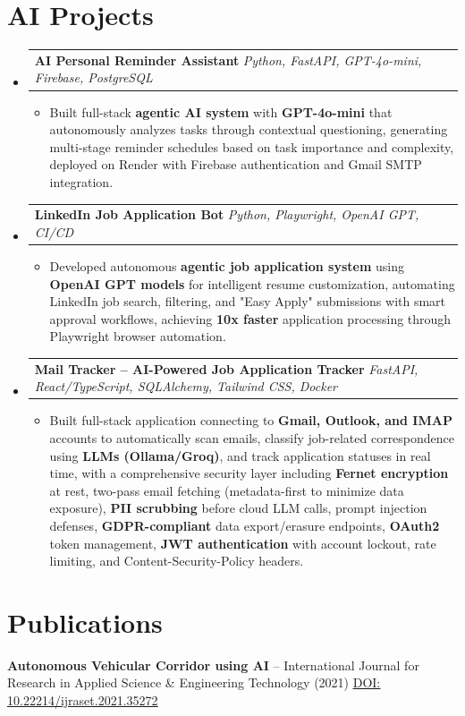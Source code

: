 \documentclass[letterpaper,11pt]{article}
\makeatletter
\newcommand{\resumeItem}[1]{
  \item\small{
    {#1 \vspace{-2pt}}
  }
}
\newcommand{\resumeProjectHeading}[2]{
    \item
    \begin{tabular*}{0.97\textwidth}{l@{\extracolsep{\fill}}r}
      \small#1 & #2 \\
    \end{tabular*}\vspace{-7pt}
}
\newcommand{\resumeSubHeadingListStart}{\begin{itemize}[leftmargin=0.15in, label={}]}
\newcommand{\resumeSubHeadingListEnd}{\end{itemize}}
\newcommand{\resumeItemListStart}{\begin{itemize}[itemsep=-1pt, leftmargin=0.1in]}
\newcommand{\resumeItemListEnd}{\end{itemize}\vspace{-7pt}}
\makeatother
\begin{document}
\section{AI Projects}
    \resumeSubHeadingListStart
      \resumeProjectHeading
          {\textbf{AI Personal Reminder Assistant} \textbar{} \emph{Python, FastAPI, GPT-4o-mini, Firebase, PostgreSQL}}{}
          \resumeItemListStart
            \resumeItem{Built full-stack \textbf{agentic AI system} with \textbf{GPT-4o-mini} that autonomously analyzes tasks through contextual questioning, generating multi-stage reminder schedules based on task importance and complexity, deployed on Render with Firebase authentication and Gmail SMTP integration.}
          \resumeItemListEnd
      \resumeProjectHeading
          {\textbf{LinkedIn Job Application Bot} \textbar{} \emph{Python, Playwright, OpenAI GPT, CI/CD}}{}
          \resumeItemListStart
            \resumeItem{Developed autonomous \textbf{agentic job application system} using \textbf{OpenAI GPT models} for intelligent resume customization, automating LinkedIn job search, filtering, and "Easy Apply" submissions with smart approval workflows, achieving \textbf{10x faster} application processing through Playwright browser automation.}
          \resumeItemListEnd
      \resumeProjectHeading
          {\textbf{Mail Tracker -- AI-Powered Job Application Tracker} \textbar{} \emph{FastAPI, React/TypeScript, SQLAlchemy, Tailwind CSS, Docker}}{}
          \resumeItemListStart
            \resumeItem{Built full-stack application connecting to \textbf{Gmail, Outlook, and IMAP} accounts to automatically scan emails, classify job-related correspondence using \textbf{LLMs (Ollama/Groq)}, and track application statuses in real time, with a comprehensive security layer including \textbf{Fernet encryption} at rest, two-pass email fetching (metadata-first to minimize data exposure), \textbf{PII scrubbing} before cloud LLM calls, prompt injection defenses, \textbf{GDPR-compliant} data export/erasure endpoints, \textbf{OAuth2} token management, \textbf{JWT authentication} with account lockout, rate limiting, and Content-Security-Policy headers.}
          \resumeItemListEnd
    \resumeSubHeadingListEnd

\section{Publications}
 \begin{itemize}[leftmargin=0.15in, label={}]
    \small{\item{
     \textbf{Autonomous Vehicular Corridor using AI} -- International Journal for Research in Applied Science \& Engineering Technology (2021) \textbar{} \href{https://doi.org/10.22214/ijraset.2021.35272}{\underline{DOI: 10.22214/ijraset.2021.35272}}
    }}
 \end{itemize}
\end{document}
